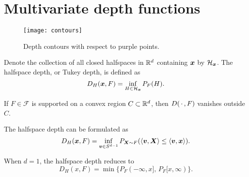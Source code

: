\section{Multivariate depth functions}

\begin{figure}
    \centering
    \texttt{[image: contours]}
    \caption{
        Depth contours with respect to purple points.
    }
    \label{fig:depthcontours}
\end{figure}


\begin{definition}
    Denote the collection of all closed halfspaces in $\mathbb{R}^d$ containing $\bm{x}$
    by $\mathcal{H}_{\bm{x}}$.
    The halfspace depth, or Tukey depth, is defined as
    \begin{equation}
        D_H(\bm{x}, F) = \inf_{H \in \mathcal{H}_{\bm{x}}} P_{F}(H).
    \end{equation}
\end{definition}

\begin{remark}
    If $F \in \mathscr{F}$ is supported on a convex region $C \subset \mathbb{R}^d$,
    then $D(\,\cdot\,, F)$ vanishes outside $C$.
\end{remark}

\begin{proposition}
    The halfspace depth can be formulated as
    \begin{equation}
        D_H(\bm{x}, F) = \inf_{\bm{v} \in S^{d - 1}} P_{\bm{X} \sim F}(\langle \bm{v}, \bm{X} \rangle \leq \langle \bm{v}, \bm{x} \rangle).
    \end{equation}
\end{proposition}

\begin{remark}
    When $d = 1$, the halfspace depth reduces to
    \begin{equation}
        D_H(x, F) = \min\{P_F(-\infty, x],\, P_F[x, \infty)\}.
    \end{equation}
\end{remark}



